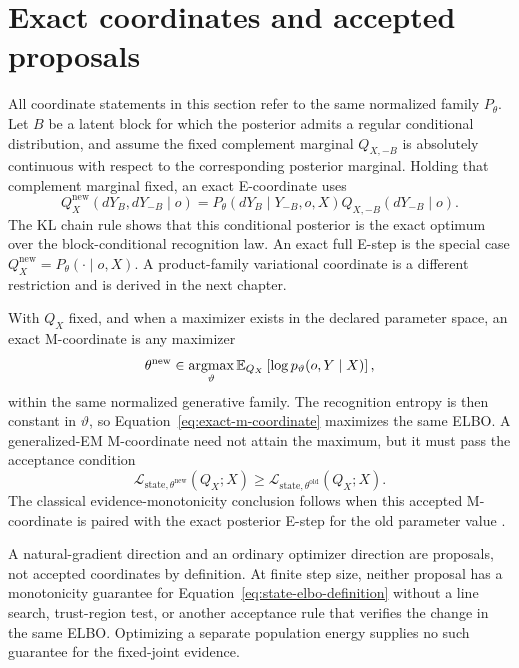 \section{Exact coordinates and accepted proposals}

All coordinate statements in this section refer to the same normalized family \(P_\theta\). Let \(B\) be a latent block for which the posterior admits a regular conditional distribution, and assume the fixed complement marginal \(Q_{X,-B}\) is absolutely continuous with respect to the corresponding posterior marginal. Holding that complement marginal fixed, an exact E-coordinate uses
\begin{equation}
Q_X^{\mathrm{new}}(dY_B,dY_{-B}\mid o)
=P_\theta(dY_B\mid Y_{-B},o,X)
Q_{X,-B}(dY_{-B}\mid o).
\label{eq:exact-e-coordinate}
\end{equation}
The KL chain rule shows that this conditional posterior is the exact optimum over the block-conditional recognition law. An exact full E-step is the special case \(Q_X^{\mathrm{new}}=P_\theta(\mathord\cdot\mid o,X)\). A product-family variational coordinate is a different restriction and is derived in the next chapter.

With \(Q_X\) fixed, and when a maximizer exists in the declared parameter space, an exact M-coordinate is any maximizer
\begin{equation}
\theta^{\mathrm{new}}
\in\operatorname*{argmax}_{\vartheta}
\mathbb E_{Q_X}\left[\log p_{\vartheta}(o,Y\mid X)\right],
\label{eq:exact-m-coordinate}
\end{equation}
within the same normalized generative family. The recognition entropy is then constant in \(\vartheta\), so Equation~\eqref{eq:exact-m-coordinate} maximizes the same ELBO. A generalized-EM M-coordinate need not attain the maximum, but it must pass the acceptance condition
\begin{equation}
\mathcal L_{\mathrm{state},\theta^{\mathrm{new}}}(Q_X;X)
\geq
\mathcal L_{\mathrm{state},\theta^{\mathrm{old}}}(Q_X;X).
\label{eq:generalized-em-acceptance}
\end{equation}
The classical evidence-monotonicity conclusion follows when this accepted M-coordinate is paired with the exact posterior E-step for the old parameter value \citep{Dempster1977,Neal1998}.

A natural-gradient direction and an ordinary optimizer direction are proposals, not accepted coordinates by definition. At finite step size, neither proposal has a monotonicity guarantee for Equation~\eqref{eq:state-elbo-definition} without a line search, trust-region test, or another acceptance rule that verifies the change in the same ELBO. Optimizing a separate population energy supplies no such guarantee for the fixed-joint evidence.
